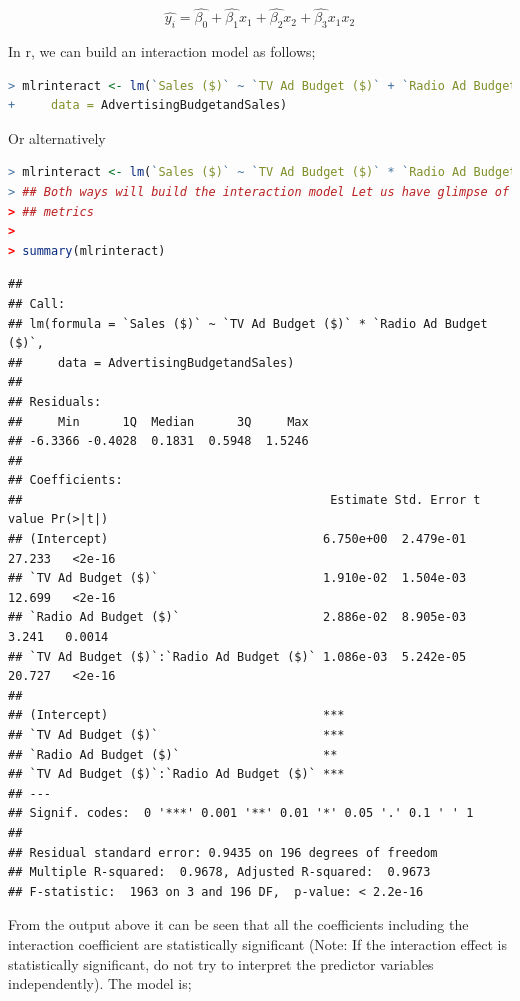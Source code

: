 \documentclass[
]{article}
\begin{document}
\[\hat{y_i}=\hat{\beta_0}+\hat{\beta_1}x_1+\hat{\beta_2}x_2+\hat{\beta_3}x_1x_2\]

In r, we can build an interaction model as follows;

\begin{lstlisting}[language=R]
> mlrinteract <- lm(`Sales ($)` ~ `TV Ad Budget ($)` + `Radio Ad Budget ($)` + `TV Ad Budget ($)`:`Radio Ad Budget ($)`,
+     data = AdvertisingBudgetandSales)
\end{lstlisting}

Or alternatively

\begin{lstlisting}[language=R]
> mlrinteract <- lm(`Sales ($)` ~ `TV Ad Budget ($)` * `Radio Ad Budget ($)`, data = AdvertisingBudgetandSales)
> ## Both ways will build the interaction model Let us have glimpse of the model
> ## metrics
> 
> summary(mlrinteract)
\end{lstlisting}

\begin{lstlisting}
## 
## Call:
## lm(formula = `Sales ($)` ~ `TV Ad Budget ($)` * `Radio Ad Budget ($)`, 
##     data = AdvertisingBudgetandSales)
## 
## Residuals:
##     Min      1Q  Median      3Q     Max 
## -6.3366 -0.4028  0.1831  0.5948  1.5246 
## 
## Coefficients:
##                                           Estimate Std. Error t value Pr(>|t|)
## (Intercept)                              6.750e+00  2.479e-01  27.233   <2e-16
## `TV Ad Budget ($)`                       1.910e-02  1.504e-03  12.699   <2e-16
## `Radio Ad Budget ($)`                    2.886e-02  8.905e-03   3.241   0.0014
## `TV Ad Budget ($)`:`Radio Ad Budget ($)` 1.086e-03  5.242e-05  20.727   <2e-16
##                                             
## (Intercept)                              ***
## `TV Ad Budget ($)`                       ***
## `Radio Ad Budget ($)`                    ** 
## `TV Ad Budget ($)`:`Radio Ad Budget ($)` ***
## ---
## Signif. codes:  0 '***' 0.001 '**' 0.01 '*' 0.05 '.' 0.1 ' ' 1
## 
## Residual standard error: 0.9435 on 196 degrees of freedom
## Multiple R-squared:  0.9678, Adjusted R-squared:  0.9673 
## F-statistic:  1963 on 3 and 196 DF,  p-value: < 2.2e-16
\end{lstlisting}

From the output above it can be seen that all the coefficients including
the interaction coefficient are statistically significant (Note: If the
interaction effect is statistically significant, do not try to interpret
the predictor variables independently). The model is;
\end{document}
